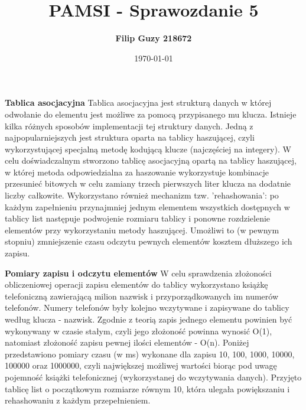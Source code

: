 \documentclass[10pt, a4paper]{article}
\date{\today}
\title{\textbf{PAMSI - Sprawozdanie 5}}
\author{\textbf{Filip Guzy 218672}}
\begin{document}
\maketitle

\begin{flushleft}
\textbf{Tablica asocjacyjna} \newline \newline
Tablica asocjacyjna jest strukturą danych w której odwołanie do elementu jest możliwe za pomocą przypisanego mu klucza. Istnieje kilka różnych sposobów implementacji tej struktury danych. Jedną z najpopularniejszych jest struktura oparta na tablicy haszującej, czyli wykorzystującej specjalną metodę kodującą klucze (najczęściej na integery). W celu doświadczalnym stworzono tablicę asocjacyjną opartą na tablicy haszującej, w której metoda odpowiedzialna za haszowanie wykorzystuje kombinacje przesunieć bitowych w celu zamiany trzech pierwszych liter klucza na dodatnie liczby całkowite. Wykorzystano również mechanizm tzw. 'rehashowania': po każdym zapełnieniu przynajmniej jednym elementem wszystkich dostępnych w tablicy list następuje podwojenie rozmiaru tablicy i ponowne rozdzielenie elementów przy wykorzystaniu metody haszującej. Umożliwi to (w pewnym stopniu) zmniejszenie czasu odczytu pewnych elementów kosztem dłuższego ich zapisu. \newline

\textbf{Pomiary zapisu i odczytu elementów} \newline \newline
W celu sprawdzenia złożoności obliczeniowej operacji zapisu elementów do tablicy wykorzystano książkę telefoniczną zawierającą milion nazwisk i przyporządkowanych im numerów telefonów. Numery telefonów były kolejno wczytywane i zapisywane do tablicy według klucza - nazwisk. Zgodnie z teorią zapis jednego elementu powinien być wykonywany w czasie stałym, czyli jego złożoność powinna wynosić O(1), natomiast złożoność zapisu pewnej ilości elementów - O(n). Poniżej przedstawiono pomiary czasu (w ms) wykonane dla zapisu 10, 100, 1000, 10000, 100000 oraz 1000000, czyli największej możliwej wartości biorąc pod uwagę pojemność książki telefonicznej (wykorzystanej do wczytywania danych). Przyjęto tablicę list o początkowym rozmiarze równym 10, która ulegała powiększaniu i rehashowaniu z każdym przepełnieniem.


\end{flushleft}
\end{document}

